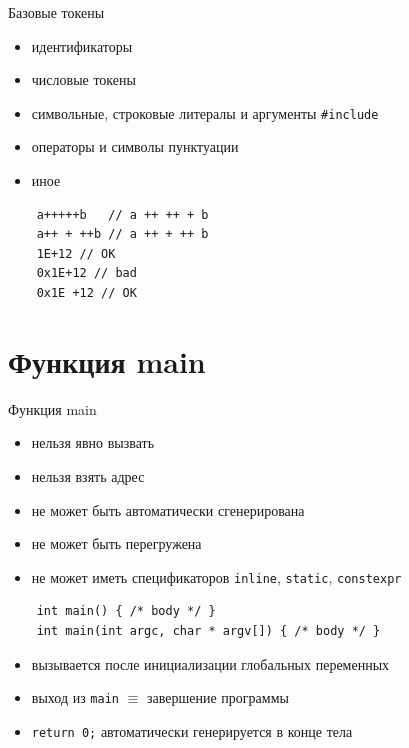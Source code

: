 \documentclass[unknownkeysallowed,xcolor=table]{beamer}
\begin{document}
\begin{frame}[fragile]{Базовые токены}
  \begin{itemize}
    \item идентификаторы
    \item числовые токены
    \item символьные, строковые литералы и аргументы \lstinline{#include}
    \item операторы и символы пунктуации
    \item иное
  \end{itemize}
  \vspace{1em}
  \begin{lstlisting}
    a+++++b   // a ++ ++ + b
    a++ + ++b // a ++ + ++ b
    1E+12 // OK
    0x1E+12 // bad
    0x1E +12 // OK
  \end{lstlisting}
\end{frame}

\section{Функция main}

\begin{frame}[fragile]{Функция main}
  \begin{itemize}
    \item нельзя явно вызвать
    \item нельзя взять адрес
    \item не может быть автоматически сгенерирована
    \item не может быть перегружена
    \item не может иметь спецификаторов \lstinline{inline}, \lstinline{static}, \lstinline{constexpr}
  \end{itemize}
  \vspace{1em}
  \begin{lstlisting}
    int main() { /* body */ }
    int main(int argc, char * argv[]) { /* body */ }
  \end{lstlisting}
  \vspace{1em}
  \begin{itemize}
    \item вызывается после инициализации глобальных переменных
    \item выход из \lstinline{main} $\equiv$ завершение программы
    \item \lstinline{return 0;} автоматически генерируется в конце тела
  \end{itemize}
\end{frame}
\end{document}
